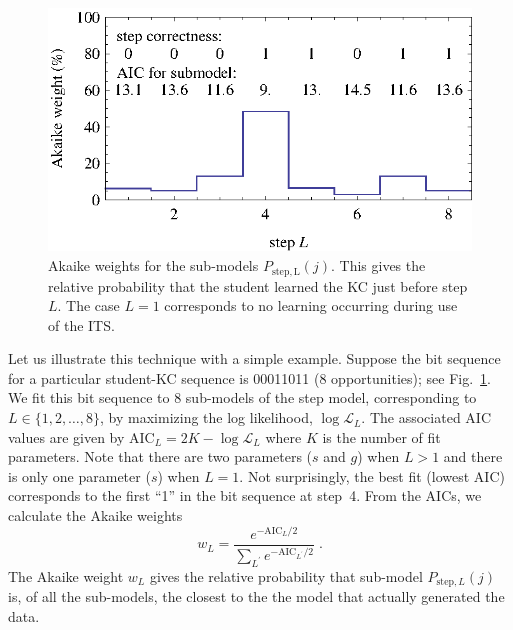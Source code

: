 \documentclass{edm_template}
\begin{document}
\begin{figure}
  \centering \includegraphics{step-weights.eps}
   \caption{Akaike weights for the sub-models $P_\mathrm{step,L}(j)$.  
     This gives the relative probability that
      the student learned the KC just before step $L$.  The case $L=1$
    corresponds to no learning occurring during use of the ITS.}  
    \label{step-weights}
\end{figure}

Let us illustrate this technique with a simple example.  Suppose the
bit sequence for a particular student-KC sequence is 00011011 (8
opportunities); see Fig.~\ref{step-weights}.  We fit this bit sequence to 8
sub-models of the step model, corresponding to $L\in\{1,2,\ldots,8\}$,
by maximizing the log likelihood, $\log\mathcal{L}_L$.  The associated
AIC values are given by $\mathrm{AIC}_L=2 K-\log \mathcal{L}_L$ where
$K$ is the number of fit parameters.  Note that there are two
parameters ($s$ and $g$) when $L>1$ and there is only one parameter
($s$) when $L=1$.
%
%
Not surprisingly, the best fit (lowest AIC) corresponds to the first
``1'' in the bit sequence at step~4.  From the AICs, we calculate 
the Akaike weights
%
\begin{equation}
     w_L=\frac{e^{-\mathrm{AIC}_L/2} }{\sum_{L^\prime}
       e^{-\mathrm{AIC}_{L^\prime}/2}} \; .
\end{equation}
%
The Akaike weight $w_L$ gives the relative probability that sub-model 
$P_{\mathrm{step},L}(j)$ is, of all the sub-models, the closest to the 
the model that actually generated the data.
\end{document}
